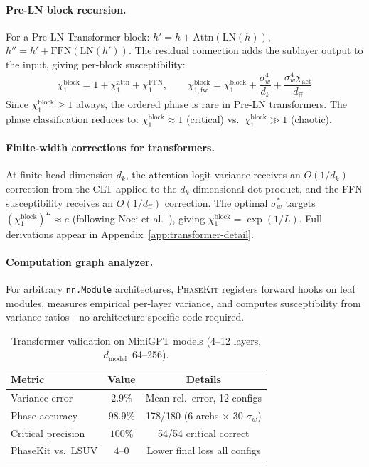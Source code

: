 \documentclass[10pt]{article}
\newcommand{\ToolName}{\textsc{PhaseKit}}
\begin{document}
\paragraph{Pre-LN block recursion.}
For a Pre-LN Transformer block: $h' = h + \text{Attn}(\text{LN}(h))$, $h'' = h' + \text{FFN}(\text{LN}(h'))$.
The residual connection adds the sublayer output to the input, giving per-block susceptibility:
\begin{equation}
    \chi_1^{\text{block}} = 1 + \chi_1^{\text{attn}} + \chi_1^{\text{FFN}}, \qquad
    \chi_{1,\text{fw}}^{\text{block}} = \chi_1^{\text{block}} + \frac{\sigma_w^4}{d_k} + \frac{\sigma_w^4 \chi_{\text{act}}}{d_{\text{ff}}}
    \label{eq:block-chi1}
\end{equation}
Since $\chi_1^{\text{block}} \geq 1$ always, the ordered phase is rare in Pre-LN transformers.
The phase classification reduces to: $\chi_1^{\text{block}} \approx 1$ (critical) vs.\ $\chi_1^{\text{block}} \gg 1$ (chaotic).

\paragraph{Finite-width corrections for transformers.}
At finite head dimension $d_k$, the attention logit variance receives an $O(1/d_k)$ correction from the CLT applied to the $d_k$-dimensional dot product, and the FFN susceptibility receives an $O(1/d_{\text{ff}})$ correction.
The optimal $\sigma_w^*$ targets $(\chi_1^{\text{block}})^L \approx e$ (following Noci et al.~\cite{noci2022signal}), giving $\chi_1^{\text{block}} = \exp(1/L)$.
Full derivations appear in Appendix~\ref{app:transformer-detail}.

\paragraph{Computation graph analyzer.}
For arbitrary \texttt{nn.Module} architectures, \ToolName{} registers forward hooks on leaf modules, measures empirical per-layer variance, and computes susceptibility from variance ratios---no architecture-specific code required.

\begin{table}[t]
\centering
\caption{Transformer validation on MiniGPT models (4--12 layers, $d_{\text{model}}$~64--256).}
\label{tab:transformer-results}
\small
\begin{tabular}{@{}lcc@{}}
\toprule
\textbf{Metric} & \textbf{Value} & \textbf{Details} \\
\midrule
Variance error & $2.9\%$ & Mean rel.\ error, 12 configs \\
Phase accuracy & $98.9\%$ & 178/180 (6 archs $\times$ 30 $\sigma_w$) \\
Critical precision & $100\%$ & 54/54 critical correct \\
PhaseKit vs.\ LSUV & $4$--$0$ & Lower final loss all configs \\
\bottomrule
\end{tabular}
\end{table}
\end{document}

